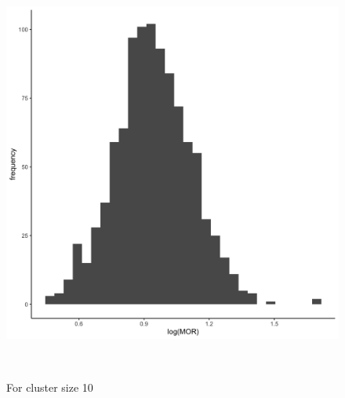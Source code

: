 \documentclass[
  letterpaper,
  DIV=11,
  numbers=noendperiod,
  titlepage]{scrartcl}
\begin{document}
\begin{figure}
\begin{minipage}[t]{0.50\linewidth}
{{\includegraphics{../../plots/two-lvl-ran-slope/low-prev/hist_100_10_two_lvl_slp_low_prev.png}

}

\caption{For cluster size 10}

}

\end{minipage}%
\newline
\begin{minipage}[t]{\linewidth}

{\centering 

~

}

\end{minipage}%
\newline
\begin{minipage}[t]{0.50\linewidth}

{\centering 

\raisebox{-\height}{

}}
\end{minipage}
\end{figure}
\end{document}
